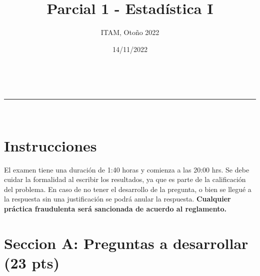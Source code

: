 \documentclass[addpoints]{exam}
\makeatletter
\newcommand{\linia}{\rule{\linewidth}{0.5pt}}
\theoremstyle{mytheor}
\renewcommand{\maketitle}{
    \begin{center}
    \vspace{2ex}
    {\huge \textsc{\@title}}
    \vspace{1ex}
    \\
    \linia\\
    \@author \hfill \@date
    \vspace{4ex}
    \end{center}
  }
\makeatother
\begin{document}
  
  \title{Parcial 1 - Estadística I}
  
  \author{ITAM, Otoño 2022}
  
  \date{14/11/2022}
  
  \maketitle
  
  \section*{Instrucciones}
  
El examen tiene una duración de 1:40 horas y comienza a las 20:00 hrs. Se debe cuidar la formalidad al escribir los resultados, ya que es parte de la calificación del problema. En caso de no tener el desarrollo de la pregunta, o bien se llegué a la respuesta sin una justificación se podrá anular la respuesta. \textbf{Cualquier práctica fraudulenta será sancionada de acuerdo al reglamento.} 

\vspace{10pt}
  
  \section*{Seccion A: Preguntas a desarrollar (23 pts)}
  
\end{document}
